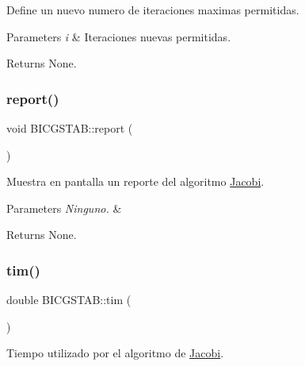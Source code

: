 Define un nuevo numero de iteraciones maximas permitidas. 


\begin{DoxyParams}{Parameters}
{\em i} & Iteraciones nuevas permitidas. \\
\hline
\end{DoxyParams}
\begin{DoxyReturn}{Returns}
None. 
\end{DoxyReturn}
\hypertarget{class_b_i_c_g_s_t_a_b_a5ebc32bd9c0892557018802781f7c65a}{}\label{class_b_i_c_g_s_t_a_b_a5ebc32bd9c0892557018802781f7c65a} 
\subsubsection{\texorpdfstring{report()}{report()}}
{\footnotesize\ttfamily void B\+I\+C\+G\+S\+T\+A\+B\+::report (\begin{DoxyParamCaption}{ }\end{DoxyParamCaption})\hspace{0.3cm}{\ttfamily [inline]}}



Muestra en pantalla un reporte del algoritmo \hyperlink{class_jacobi}{Jacobi}. 


\begin{DoxyParams}{Parameters}
{\em Ninguno.} & \\
\hline
\end{DoxyParams}
\begin{DoxyReturn}{Returns}
None. 
\end{DoxyReturn}
\hypertarget{class_b_i_c_g_s_t_a_b_a6a09944cd69150098c82760d058d4857}{}\label{class_b_i_c_g_s_t_a_b_a6a09944cd69150098c82760d058d4857} 
\subsubsection{\texorpdfstring{tim()}{tim()}}
{\footnotesize\ttfamily double B\+I\+C\+G\+S\+T\+A\+B\+::tim (\begin{DoxyParamCaption}{ }\end{DoxyParamCaption})\hspace{0.3cm}{\ttfamily [inline]}}



Tiempo utilizado por el algoritmo de \hyperlink{class_jacobi}{Jacobi}. 



